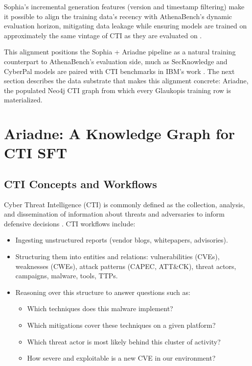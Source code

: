 \documentclass[conference]{IEEEtran}
\begin{document}
Sophia's incremental generation features (version and timestamp filtering) make it possible to align the training data's recency with AthenaBench's dynamic evaluation horizon, mitigating data leakage while ensuring models are trained on approximately the same vintage of CTI as they are evaluated on \cite{cardei2025ift,alam2025athenabench}.

This alignment positions the Sophia + Ariadne pipeline as a natural training counterpart to AthenaBench's evaluation side, much as SecKnowledge and CyberPal models are paired with CTI benchmarks in IBM's work \cite{levi2024cyberpal,levi2025toward}. The next section describes the data substrate that makes this alignment concrete: Ariadne, the populated Neo4j CTI graph from which every Glaukopis training row is materialized.

\section{Ariadne: A Knowledge Graph for CTI SFT}
\label{sec:cti-kg}

\subsection{CTI Concepts and Workflows}

Cyber Threat Intelligence (CTI) is commonly defined as the collection, analysis, and dissemination of information about threats and adversaries to inform defensive decisions \cite{mcmillan2013gartner}. CTI workflows include:

\begin{itemize}
  \item Ingesting unstructured reports (vendor blogs, whitepapers, advisories).
  \item Structuring them into entities and relations: vulnerabilities (CVEs), weaknesses (CWEs), attack patterns (CAPEC, ATT\&CK), threat actors, campaigns, malware, tools, TTPs.
  \item Reasoning over this structure to answer questions such as:
    \begin{itemize}
      \item Which techniques does this malware implement?
      \item Which mitigations cover these techniques on a given platform?
      \item Which threat actor is most likely behind this cluster of activity?
      \item How severe and exploitable is a new CVE in our environment?
    \end{itemize}
\end{itemize}
\end{document}
